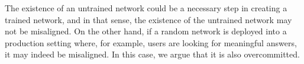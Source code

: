 \documentclass[12pt]{article}
\begin{document}
The existence of an untrained network could be a necessary step in creating a trained network, and in that sense, the existence of the untrained network may not be misaligned. On the other hand, if a random network is deployed into a production setting where, for example, users are looking for meaningful answers, it may indeed be misaligned. In this case, we argue that it is also overcommitted.





\end{document}
